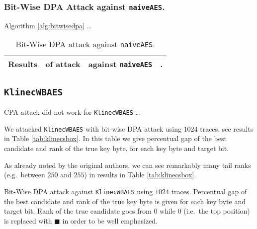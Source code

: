 \subsubsection{Bit-Wise DPA Attack against {\tt naiveAES}.}
	
	Algorithm \ref{alg:bitwisedpa} \ldots
	
	\begin{table}[H]
		\begin{center}
		\begin{tabular}{| c | c | c | c |}
			\hline
			Results & of attack & against {\tt naiveAES} & . \\
			\hline
		\end{tabular}
		\end{center}
	\caption{Bit-Wise DPA attack against {\tt naiveAES}.}
	\label{tab:naiveaesdca}
	\end{table}



\subsection{\tt KlinecWBAES}
\label{sec:klinecwbaes}
	
	CPA attack did not work for {\tt KlinecWBAES} \ldots
	
	We attacked {\tt KlinecWBAES} with bit-wise DPA attack using $1024$ traces, see results in Table \ref{tab:klinecsbox}.
	In this table we give percentual gap of the best candidate and rank of the true key byte, for each key byte and target bit.
	
	\begin{note}
	\label{note:tailrank}
		As already noted by the original authors, we can see remarkably many tail ranks (e.g.\ between $250$ and $255$) in results in Table \ref{tab:klinecsbox}.
	\end{note}
	
	\begin{landscape}
	\begin{table}[H]   %
		\begin{center}
		
		\end{center}
	\caption{Bit-Wise DPA attack against {\tt KlinecWBAES} using $1024$ traces. Percentual gap of the best candidate and rank of the true key byte is given for each key byte and target bit. Rank of the true candidate goes from $0$ while $0$ (i.e.\ the top position) is replaced with $\blacksquare$ in order to be well emphasized.}
	\label{tab:klinecsbox}
	\end{table}
	\end{landscape}
	

